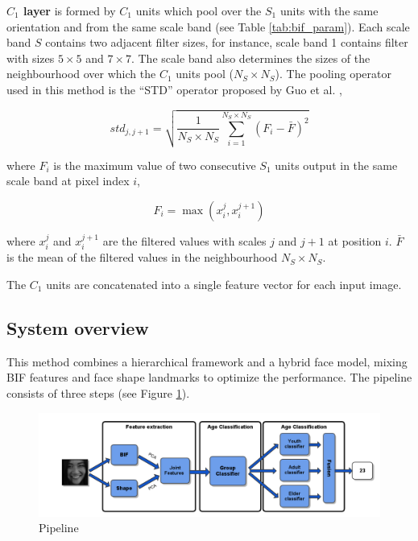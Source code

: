 \textbf{$C_1$ layer} is formed by $C_1$ units which pool over the $S_1$ units with the same orientation and from the same scale band (see Table \ref{tab:bif_param}). Each scale band $S$ contains two adjacent filter sizes, for instance, scale band 1 contains filter with sizes $5\times5$ and $7\times7$. The scale band also determines the sizes of the neighbourhood over which the $C_1$ units pool ($N_S\times N_S$). The pooling operator used in this method is the ``STD'' operator proposed by Guo et al. \cite{conf/cvpr/GuoMFH09},

\begin{equation}
std_{j,j+1} = \sqrt{\frac{1}{N_S\times N_S}\sum_{i=1}^{N_S\times N_S}(F_i - \bar{F})^2} 
\end{equation}

where $F_i$ is the maximum value of two consecutive $S_1$ units output in the same scale band at pixel index $i$, 

\begin{equation}
F_i = \max(x_i^j,x_i^{j+1})
\end{equation}

where $x_i^j$ and $x_i^{j+1}$ are the filtered values with scales $j$ and $j+1$ at position $i$. $\bar{F}$ is the mean of the filtered values in the neighbourhood $N_S\times N_S$.

The $C_1$ units are concatenated into a single feature vector for each input image.


\subsection{System overview}

This method combines a hierarchical framework and a hybrid face model, mixing BIF features and face shape landmarks to optimize the performance. The pipeline consists of three steps (see Figure \ref{fig:pipeline}).

\begin{figure}[!h]
	\centering
	\includegraphics[width=\textwidth]{figures/pipeline}
	\caption{ Pipeline}
	\label{fig:pipeline}
\end{figure}

